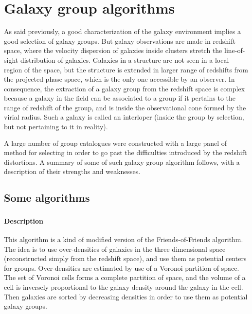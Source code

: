 \chapter{Galaxy group algorithms}
\label{cha:galaxy_group_algorithms}
\minitoc%

As said previously, a good characterization of the galaxy environment implies a
good selection of galaxy groups. But galaxy observations are made in redshift
space, where the velocity dispersion of galaxies inside clusters stretch the
line-of-sight distribution of galaxies. Galaxies in a structure are not seen in
a local region of the space, but the structure is extended in larger range of
redshifts from the projected phase space, which is the only one accessible by
an observer.
In consequence, the extraction of a galaxy group from the redshift space is
complex because a galaxy in the field can be associated to a group if it
pertains to the range of redshift of the group, and is inside the observational
cone formed by the virial radius. Such a galaxy is called an interloper (inside
the group by selection, but not pertaining to it in reality).

A large number of group catalogues were constructed with a large panel of
method for selecting in order to go past the difficulties introduced by the
redshift distortions. A summary of some of such galaxy group algorithm follows,
with a description of their strengths and weaknesses.

\section{Some algorithms}
\label{sec:some_algorithms}

\subsection{\citet{Marinoni+02}}
\label{sub:marinoni02}

\subsubsection{Description}
\label{ssub:description}

This algorithm is a kind of modified version of the Friends-of-Friends
algorithm. The idea is to use over-densities of galaxies in the three
dimensional space (reconstructed simply from the redshift space), and use them
as potential centers for groups. Over-densities are estimated by use of a
Voronoi partition of space. The set of Voronoi cells forms a complete partition
of space, and the volume of a cell is inversely proportional to the galaxy
density around the galaxy in the cell. Then galaxies are sorted by decreasing
densities in order to use them as potential galaxy groups.

